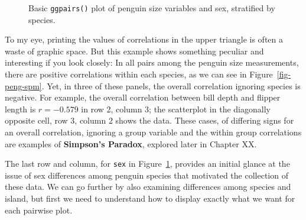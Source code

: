\documentclass[
  letterpaper,
  10pt,
  krantz2]{krantz}
\begin{document}
{\begin{figure}[H]

\caption{\label{fig-peng-ggpairs1}Basic \texttt{ggpairs()} plot of
penguin size variables and sex, stratified by species.}

\end{figure}%

To my eye, printing the values of correlations in the upper triangle is
often a waste of graphic space. But this example shows something
peculiar and interesting if you look closely: In all pairs among the
penguin size measurements, there are positive correlations within each
species, as we can see in Figure~\ref{fig-peng-spm}. Yet, in three of
these panels, the overall correlation ignoring species is negative. For
example, the overall correlation between bill depth and flipper length
is \(r = -0.579\) in row 2, column 3; the scatterplot in the diagonally
opposite cell, row 3, column 2 shows the data. These cases, of differing
signs for an overall correlation, ignoring a group variable and the
within group correlations are examples of \textbf{Simpson's Paradox},
explored later in Chapter XX.

The last row and column, for \texttt{sex} in
Figure~\ref{fig-peng-ggpairs1}, provides an initial glance at the issue
of sex differences among penguin species that motivated the collection
of these data. We can go further by also examining differences among
species and island, but first we need to understand how to display
exactly what we want for each pairwise plot.

}
\end{document}
